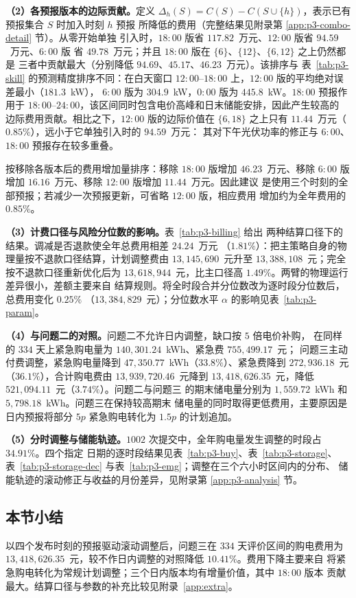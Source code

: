 \textbf{（2）各预报版本的边际贡献。}定义
$\Delta_h(S)=C(S)-C(S\cup\{h\})$，表示已有预报集合 $S$ 时加入时刻 $h$ 预报
所降低的费用（完整结果见附录第 \ref{app:p3-combo-detail} 节）。从零开始单独
引入时，$18{:}00$ 版省 $117.82$~万元、$12{:}00$ 版省 $94.59$~万元、$6{:}00$ 版
省 $49.78$~万元；并且 $18{:}00$ 版在 $\{6\}$、$\{12\}$、$\{6,12\}$ 之上仍然都是
三者中贡献最大（分别降低 $94.69$、$45.17$、$46.23$~万元）。该排序与
表~\ref{tab:p3-skill} 的预测精度排序不同：在白天窗口
$12{:}00$--$18{:}00$ 上，$12{:}00$ 版的平均绝对误差最小（$181.3$~kW），
$6{:}00$ 版为 $304.9$~kW，$0{:}00$ 版为 $445.8$~kW。$18{:}00$ 预报作用于
$18{:}00$--$24{:}00$，该区间同时包含电价高峰和日末储能安排，因此产生较高的
边际费用贡献。相比之下，$12{:}00$ 版的边际价值在
$\{6,18\}$ 之上只有 $11.44$~万元（$0.85\%$），远小于它单独引入时的 $94.59$~万元：
其对下午光伏功率的修正与 $6{:}00$、$18{:}00$ 预报存在较多重叠。

按移除各版本后的费用增加量排序：移除 $18{:}00$ 版增加 $46.23$~万元、移除
$6{:}00$ 版增加 $16.16$~万元、移除 $12{:}00$ 版增加 $11.44$~万元。因此建议
是使用三个时刻的全部预报；若减少一次预报更新，可省略 $12{:}00$ 版，相应费用
增加约为全年费用的 $0.85\%$。

\textbf{（3）计费口径与风险分位数的影响。}表~\ref{tab:p3-billing} 给出
两种结算口径下的结果。调减是否退款使全年总费用相差 $24.24$~万元
（$1.81\%$）：把主策略自身的物理量按不退款口径结算，计划调整费由
$13{,}145{,}690$~元升至 $13{,}388{,}108$~元；完全按不退款口径重新优化后为
$13{,}618{,}944$~元，比主口径高 $1.49\%$。两臂的物理运行差异很小，差额主要来自
结算规则。将全时段合并分位数改为逐时段分位数后，总费用变化 $0.25\%$
（$13{,}384{,}829$~元）；分位数水平 $\alpha$ 的影响见表~\ref{tab:p3-param}。

\textbf{（4）与问题二的对照。}问题二不允许日内调整，缺口按 $5$ 倍电价补购，
在同样的 $334$ 天上紧急购电量为 $140{,}301.24$~kWh、紧急费 $755{,}499.17$~元；
问题三主动付费调整，紧急购电量降到 $47{,}350.77$~kWh（$33.8\%$）、紧急费降到
$272{,}936.18$~元（$36.1\%$），合计购电费由 $13{,}939{,}720.46$~元降到
$13{,}418{,}626.35$~元，降低 $521{,}094.11$~元（$3.74\%$）。问题二与问题三
的期末储电量分别为 $1{,}559.72$~kWh 和 $5{,}798.18$~kWh。问题三在保持较高期末
储电量的同时取得更低费用，主要原因是日内预报将部分 $5p$ 紧急购电转化为
$1.5p$ 的计划追加。

\textbf{（5）分时调整与储能轨迹。}$1002$ 次提交中，全年购电量发生调整的时段占
$34.91\%$。四个指定
日期的逐时段结果见表~\ref{tab:p3-buy}、表~\ref{tab:p3-storage}、
表~\ref{tab:p3-storage-dec} 与表~\ref{tab:p3-emg}；调整在三个六小时区间内的分布、
储能轨迹的滚动修正与收益的月份差异，见附录第 \ref{app:p3-analysis} 节。

\subsection{本节小结}

以四个发布时刻的预报驱动滚动调整后，问题三在 $334$ 天评价区间的购电费用为
$13{,}418{,}626.35$~元，较不作日内调整的对照降低 $10.41\%$。费用下降主要来自
将紧急购电转化为常规计划调整；三个日内版本均有增量价值，其中 $18{:}00$ 版本
贡献最大。结算口径与参数的补充比较见附录~\ref{app:extra}。
